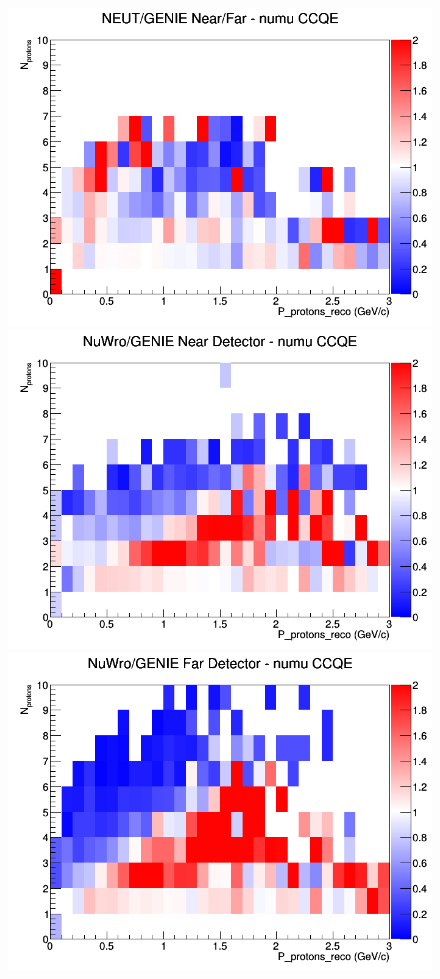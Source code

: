 \begin{figure}[h]
\endminipage
{}
\includegraphics[width=\linewidth]{eff_N_P/FGT/protons/ratios/CCQE_NEUT_GENIE_numu_NF_N_P.png}
\endminipage
\newline
{}
\includegraphics[width=\linewidth]{eff_N_P/FGT/protons/ratios/CCQE_NuWro_GENIE_numu_near_N_P.png}
\endminipage
{}
\includegraphics[width=\linewidth]{eff_N_P/FGT/protons/ratios/CCQE_NuWro_GENIE_numu_far_N_P.png}

\end{figure}
